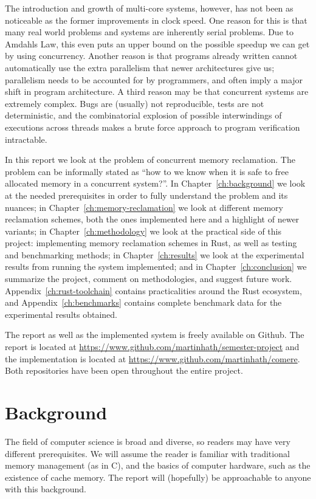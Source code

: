 \documentclass[b5paper]{report}
\begin{document}
The introduction and growth of multi-core systems, however, has not been as
noticeable as the former improvements in clock speed. One reason for this is
that many real world problems and systems are inherently serial problems. Due to
Amdahls Law, this even puts an upper bound on the possible speedup we can get by
using concurrency.  Another reason is that programs already written cannot
automatically use the extra parallelism that newer architectures give us;
parallelism needs to be accounted for by programmers, and often imply a major
shift in program architecture. A third reason may be that concurrent systems are
extremely complex. Bugs are (usually) not reproducible, tests are not
deterministic, and the combinatorial explosion of possible interwindings of
executions across threads makes a brute force approach to program verification
intractable.

In this report we look at the problem of concurrent memory reclamation. The
problem can be informally stated as ``how to we know when it is safe to free
allocated memory in a concurrent system?''. In Chapter~\ref{ch:background} we
look at the needed prerequisites in order to fully understand the problem and
its nuances; in Chapter~\ref{ch:memory-reclamation} we look at different memory
reclamation schemes, both the ones implemented here and a highlight of newer
variants; in Chapter~\ref{ch:methodology} we look at the practical side of this
project: implementing memory reclamation schemes in Rust, as well as testing and
benchmarking methods; in Chapter~\ref{ch:results} we look at the experimental
results from running the system implemented; and in Chapter~\ref{ch:conclusion}
we summarize the project, comment on methodologies, and suggest future work.
Appendix~\ref{ch:rust-toolchain} contains practicalities around the Rust
ecosystem, and Appendix~\ref{ch:benchmarks} contains complete benchmark data for
the experimental results obtained.

The report as well as the implemented system is freely available on Github.
The report is located at
\url{https://www.github.com/martinhath/semester-project} and the implementation
is located at \url{https://www.github.com/martinhath/comere}.
Both repositories have been open throughout the entire project.


\chapter{Background\label{ch:background}}

The field of computer science is broad and diverse, so readers may have very
different prerequisites.  We will assume the reader is familiar with traditional
memory management (as in C), and the basics of computer hardware, such as the
existence of cache memory. The report will (hopefully) be approachable to anyone
with this background.
\end{document}
